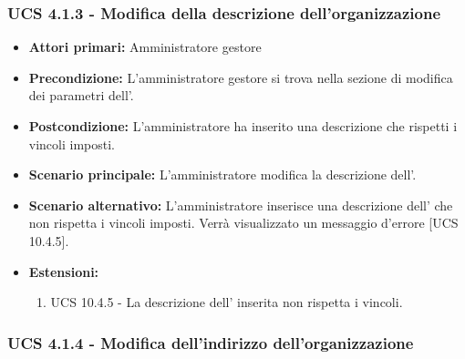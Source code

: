 \subsubsection{UCS 4.1.3 - Modifica della descrizione dell'organizzazione}%
\begin{itemize}
	\item \textbf{Attori primari:} Amministratore gestore
	\item \textbf{Precondizione:} L'amministratore gestore si trova nella sezione di modifica dei parametri dell'.
	\item \textbf{Postcondizione:} L'amministratore ha inserito una descrizione che rispetti i vincoli imposti.
	\item \textbf{Scenario principale:} L'amministratore modifica la descrizione dell'.
	\item \textbf{Scenario alternativo:} L'amministratore inserisce una descrizione dell' che non rispetta i vincoli imposti. Verrà visualizzato un messaggio d'errore [UCS 10.4.5].
	\item \textbf{Estensioni:}
	\begin{enumerate}
		\item UCS 10.4.5 - La descrizione dell' inserita non rispetta i vincoli.
	\end{enumerate}
\end{itemize}

\subsubsection{UCS 4.1.4 - Modifica dell'indirizzo dell'organizzazione}%

